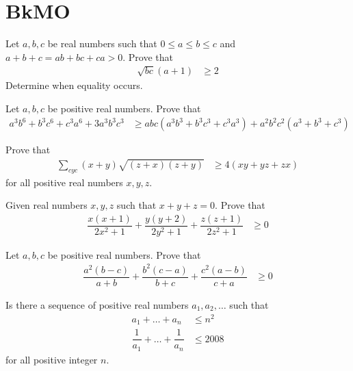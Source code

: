 \documentclass{subfile}
\begin{document}
	\section{BkMO}\label{sec:bkmo}
	
		\begin{problem}[$2019$, problem $2$]
			Let $a,b,c$ be real numbers such that $0\leq a\leq b\leq c$ and $a+b+c=ab+bc+ca>0$. Prove that
				\begin{align*}
					\sqrt{bc}(a+1)
						& \geq2
				\end{align*}
			Determine when equality occurs.
		\end{problem}
	
		\begin{problem}[$2015$, problem $1$]
			Let $a,b,c$ be positive real numbers. Prove that
				\begin{align*}
					a^{3}b^{6}+b^{3}c^{6}+c^{3}a^{6}+3a^{3}b^{3}c^{3}
						& \geq abc(a^{3}b^{3}+b^{3}c^{3}+c^{3}a^{3})+a^{2}b^{2}c^{2}(a^{3}+b^{3}+c^{3})
				\end{align*}
		\end{problem}
	
		\begin{problem}[$2012$, problem $2$]
			Prove that
				\begin{align*}
					\sum_{cyc}(x+y)\sqrt{(z+x)(z+y)}
						& \geq 4(xy+yz+zx)
				\end{align*}
			for all positive real numbers $x,y,z$.
		\end{problem}
	
		\begin{problem}[$2011$, problem $2$]
			Given real numbers $x,y,z$ such that $x+y+z=0$. Prove that
				\begin{align*}
					\dfrac{x(x+1)}{2x^{2}+1}+\dfrac{y(y+2)}{2y^{2}+1}+\dfrac{z(z+1)}{2z^{2}+1}
						& \geq 0
				\end{align*}
		\end{problem}
	
		\begin{problem}[$2010$, problem $1$]
			Let $a,b,c$ be positive real numbers. Prove that
				\begin{align*}
					\dfrac{a^{2}(b-c)}{a+b}+\dfrac{b^{2}(c-a)}{b+c}+\dfrac{c^{2}(a-b)}{c+a}
						& \geq0
				\end{align*}
		\end{problem}
	
		\begin{problem}[$2008$, problem $2$]
			Is there a sequence of positive real numbers $a_{1},a_{2},\ldots$ such that
				\begin{align*}
					a_{1}+\ldots+a_{n}
						& \leq n^{2}\\
					\dfrac{1}{a_{1}}+\ldots+\dfrac{1}{a_{n}}
						& \leq 2008
				\end{align*}
			for all positive integer $n$.
		\end{problem}
	
\end{document}
